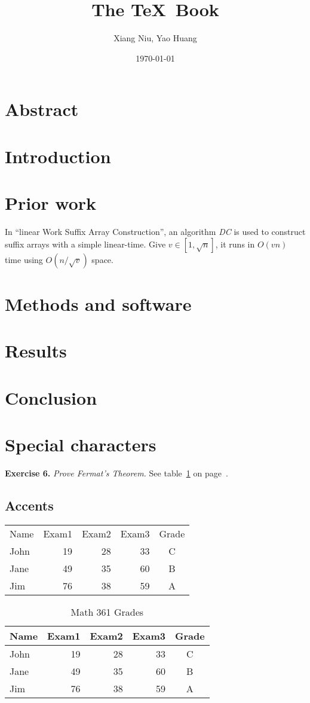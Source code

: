 \documentclass[a4paper,12pt]{article}
\author{Xiang Niu, Yao Huang}
\title{The \TeX\ Book}
\date{\today}
\begin{document}
\maketitle
\section{Abstract}
\section{Introduction}
\section{Prior work}
In ``linear Work Suffix Array Construction''\cite{simple}, an algorithm \textit{DC} is used to construct suffix arrays with a simple linear-time. Give $v \in [1,\sqrt{n}]$, it runs in $O(vn)$ time using $O(n/\sqrt{v})$ space.

\section{Methods and software}
\section{Results}
\section{Conclusion}
\section{Special characters}
\textbf{Exercise 6.} \textit{Prove Fermat's Theorem.}
See table~\ref{tab:test} on page~\pageref{tab:test}.
\subsection{Accents}
\begin{tabular}{l r r r c} 
Name&Exam1&Exam2&Exam3&Grade\\
John&19& 28&33&C \\
Jane&49& 35&60&B  \\
Jim&76& 38&59&A 
\end{tabular}

\begin{table}
\begin{center}
\begin{tabular}{| l || r | r | r | c |}  
\hline
Name&Exam1&Exam2&Exam3&Grade\\
\hline\hline
John&19& 28&33&C \\  
\hline
Jane&49& 35&60&B  \\
\hline
Jim&76& 38&59&A  \\
\hline
\end{tabular}
\caption{Math 361 Grades\label{tab:test}} 
\end{center}
\end{table}
\end{document}
